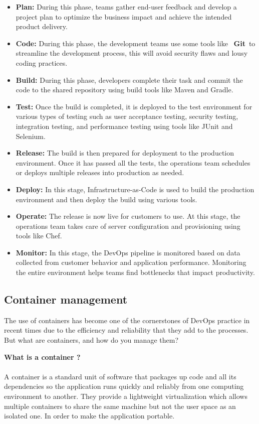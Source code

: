 \begin{itemize}
  \item \textbf{Plan:} During this phase, teams gather end-user feedback and develop a project plan to optimize the business impact and achieve the intended product delivery.
  \item \textbf{Code:} During this phase, the development teams use some tools like  \textbf{Git} to streamline the development process, this will avoid security flaws and lousy coding practices.
  \item \textbf{Build:} During this phase, developers complete their task and  commit the code to the shared repository using build tools like Maven and Gradle.
  \item \textbf{Test:} Once the build is completed, it is deployed to the test environment for various types of testing such as user acceptance testing, security testing, integration testing, and performance testing using tools like JUnit and Selenium.
  \item \textbf{Release:} The build is then prepared for deployment to the production environment. Once it has passed all the tests, the operations team schedules or deploys multiple releases into production as needed.
  \item \textbf{Deploy:} In this stage, Infrastructure-as-Code is used to build the production environment and then deploy the build using various tools.
  \item \textbf{Operate:} The release is now live for customers to use. At this stage, the operations team takes care of server configuration and provisioning using tools like Chef.
  \item \textbf{Monitor:} In this stage, the DevOps pipeline is monitored based on data collected from customer behavior and application performance. Monitoring the entire environment helps teams find bottlenecks that impact productivity.
  

\end{itemize}


\subsection{Container management}
The use of containers has become one of the cornerstones of DevOps practice in recent times due to the efficiency and reliability that they add to the processes. But what are containers, and how do you manage them?

\textbf{What is a container ?}
\paragraph*{}
A container is a standard unit of software that packages up code and all its dependencies so the application runs quickly and reliably from one computing environment to another. They provide a lightweight virtualization which allows multiple containers to share the same machine but not the user space as an isolated one. 
In order to make the application portable.

